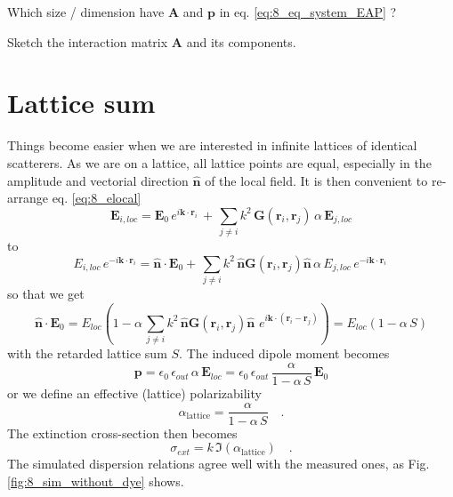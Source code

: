  
\begin{questions} 
  \item Which size / dimension have $ \mathbf{A}$ and $\mathbf{p}$ in eq. \ref{eq:8_eq_system_EAP} ?
  \item Sketch the interaction matrix $ \mathbf{A}$ and its components.
  \end{questions}
  
 

\section{Lattice sum}

Things become easier when we are interested in infinite lattices of identical scatterers. As we are on a lattice, all lattice points are equal, especially in the amplitude and vectorial direction $\mathbf{\hat{n}}$ of the local field. It is then 
 convenient to re-arrange eq. \ref{eq:8_elocal}
\begin{equation}
\mathbf{E}_{i, loc} =\mathbf{E}_{0} \, e^{i \mathbf{k} \cdot \mathbf{r}_i} \, +  \, 
 \sum_{j \neq i} k^2 \, 
\mathbf{G}(\mathbf{r}_i, \mathbf{r}_j) \,    \alpha \, \mathbf{E}_{j,loc}
\end{equation}
to
\begin{equation}
E_{i, loc}  \, e^{-i \mathbf{k} \cdot \mathbf{r}_i} =\mathbf{\hat{n}} \cdot \mathbf{E}_{0}  +  \, 
 \sum_{j \neq i} k^2 \, 
 \mathbf{\hat{n}} \mathbf{G}(\mathbf{r}_i, \mathbf{r}_j)  \mathbf{\hat{n}}\,    \alpha \, E_{j,loc} \, e^{-i \mathbf{k} \cdot \mathbf{r}_i} \,
\end{equation}
so that we get
\begin{equation}
\mathbf{\hat{n}} \cdot \mathbf{E}_{0} = 
E_{loc} \left( 1 -     \alpha  \,
 \sum_{j \neq i} k^2 \, 
 \mathbf{\hat{n}} \mathbf{G}(\mathbf{r}_i, \mathbf{r}_j)  \mathbf{\hat{n}}\,     \, e^{i \mathbf{k} \cdot ( \mathbf{r}_i - \mathbf{r}_j  ) } \right)
 = 
 {E}_{loc} \left( 1 -     \alpha  \, S \right)
\end{equation}
with the retarded lattice sum $S$. The induced
dipole moment becomes 
\begin{equation}
\mathbf{p} = \epsilon_0 \, \epsilon_{out} \, \alpha \, \mathbf{E}_{loc} =  \epsilon_0 \, \epsilon_{out} \, \frac{\alpha}{ 1 -     \alpha  \, S } \,
  \mathbf{E}_{0} 
\end{equation} 
or  we define an effective (lattice) polarizability
\begin{equation}
\alpha_\text{lattice} = \frac{\alpha}{ 1 -     \alpha  \, S }  \quad .
\end{equation} 
The extinction cross-section then becomes
\begin{equation}
\sigma_{ext} = k \, \Im(\alpha_\text{lattice})  \quad . \label{eq:8_lattice_ext}
\end{equation}
The simulated dispersion relations agree well with the measured ones, as Fig.\ref{fig:8_sim_without_dye} shows.

